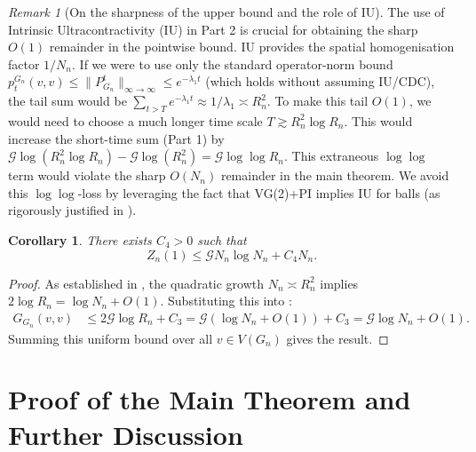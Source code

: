 \documentclass{article}
\numberwithin{equation}{section}
\newtheorem{corollary}[theorem]{Corollary}
\theoremstyle{definition}
\theoremstyle{remark}
\newtheorem{remark}[theorem]{Remark}
\newcommand{\cG}{\mathcal{G}}
\begin{document}
\begin{remark}[On the sharpness of the upper bound and the role of IU]\label{rem:IU_necessity}
The use of Intrinsic Ultracontractivity (IU) in Part 2 is crucial for obtaining the sharp $O(1)$ remainder in the pointwise bound. IU provides the spatial homogenisation factor $1/N_n$. If we were to use only the standard operator-norm bound $p_t^{G_n}(v,v) \le \|P_{G_n}^t\|_{\infty \to \infty} \le e^{-\lambda_1 t}$ (which holds without assuming IU/CDC), the tail sum would be $\sum_{t>T} e^{-\lambda_1 t} \approx 1/\lambda_1 \asymp R_n^2$. To make this tail $O(1)$, we would need to choose a much longer time scale $T \gtrsim R_n^2 \log R_n$. This would increase the short-time sum (Part 1) by $\cG \log(R_n^2 \log R_n) - \cG \log(R_n^2) = \cG \log\log R_n$. This extraneous $\log\log$ term would violate the sharp $O(N_n)$ remainder in the main theorem. We avoid this $\log\log$-loss by leveraging the fact that VG(2)+PI implies IU for balls (as rigorously justified in ).
\end{remark}


\begin{corollary}\label{cor:upper}
There exists $C_4 > 0$ such that
\[
Z_n(1) \leq \cG N_n \log N_n + C_4 N_n.
\]
\end{corollary}

\begin{proof}
As established in , the quadratic growth $N_n \asymp R_n^2$ implies $2\log R_n = \log N_n + O(1)$. Substituting this into :
\begin{align*}
G_{G_n}(v,v) &\leq 2\cG \log R_n + C_3 = \cG (\log N_n + O(1)) + C_3 = \cG \log N_n + O(1).
\end{align*}
Summing this uniform bound over all $v \in V(G_n)$ gives the result.
\end{proof}

\section{Proof of the Main Theorem and Further Discussion}\label{sec:discussion}
\end{document}
